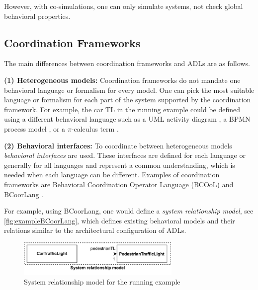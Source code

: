 \documentclass[runningheads]{llncs}
\begin{document}
However, with co-simulations, one can only simulate systems, not check global behavioral properties.

\subsection{Coordination Frameworks} \label{subsec:frameworks}

The main differences between coordination frameworks and ADLs are as follows.

\textbf{(1) Heterogeneous models:} Coordination frameworks do not mandate one behavioral language or formalism for every model.
One can pick the most suitable language or formalism for each part of the system supported by the coordination framework.
For example, the car TL in the running example could be defined using a different behavioral language such as a UML activity diagram \cite{objectmanagementgroupUnifiedModelingLanguage2017}, a BPMN process model \cite{objectmanagementgroupBusinessProcessModel2013}, or a $\pi$-calculus term \cite{milnerCommunicatingMobileSystems2010}.

\textbf{(2) Behavioral interfaces:} To coordinate between heterogeneous models \textit{behavioral interfaces} are used.
These interfaces are defined for each language or generally for all languages and represent a common understanding, which is needed when each language can be different.
Examples of coordination frameworks are Behavioral Coordination Operator Language (BCOoL) \cite{varalarsenBCOolBehavioralCoordination2016,varalarsenBehavioralCoordinationOperator2015} and BCoorLang \cite{krauterBehavioralConsistencyMultimodeling2023}.

For example, using BCoorLang, one would define a \textit{system relationship model}, see \autoref{fig:exampleBCoorLang}, which defines existing behavioral models and their relations similar to the architectural configuration of ADLs.

\begin{figure}[ht]
	\centering
	\includegraphics[width=0.7\textwidth]{images/running_example_BCorrLang}
	\caption{System relationship model for the running example}
	\label{fig:exampleBCoorLang}
\end{figure}
\end{document}
